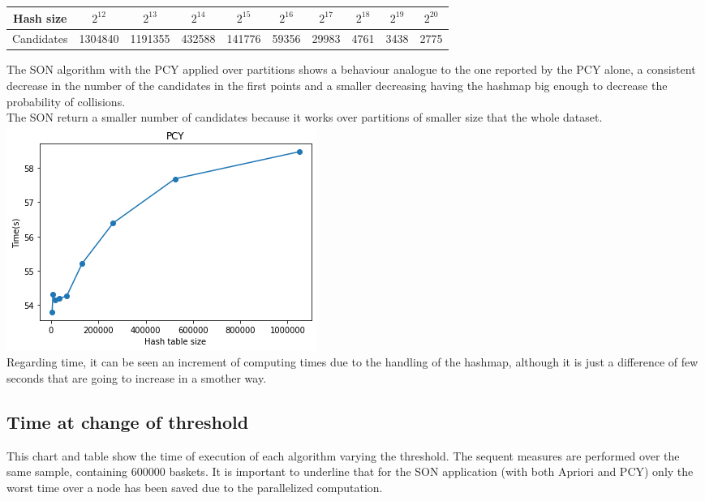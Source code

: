 \documentclass[14pt]{extarticle}
\begin{document}
\begin{center}
\hspace*{-1,5cm}
\begin{tabular}{ |c||c|c|c|c|c|c|c|c|c| } 
 \hline
 Hash size & $2^{12}$ & $2^{13}$ & $2^{14}$ & $2^{15}$ & $2^{16}$ & $2^{17}$ & $2^{18}$ & $2^{19}$ & $2^{20}$ \\
 \hline
 Candidates & 1304840 & 1191355 & 432588 & 141776 & 59356 & 29983 &  4761 & 3438 & 2775 \\
 \hline
\end{tabular}
\end{center}
The SON algorithm with the PCY applied over partitions shows a behaviour analogue to the one reported by the PCY alone, a consistent decrease in the number of the candidates in the first points and a smaller decreasing having the hashmap big enough to decrease the probability of collisions.\\
The SON return a smaller number of candidates because it works over partitions of smaller size that the whole dataset.\\
\includegraphics[scale=1]{pcy_hsize_time.png}\\
Regarding time, it can be seen an increment of computing times due to the handling of the hashmap, although it is just a difference of few seconds that are going to increase in a smother way.\\

\subsection{Time at change of threshold}
This chart and table show the time of execution of each algorithm varying the threshold. 
The sequent measures are performed over the same sample, containing 600000 baskets.
It is important to underline that for the SON application (with both Apriori and PCY) only the worst time over a node has been saved due to the parallelized computation.\\
\end{document}

